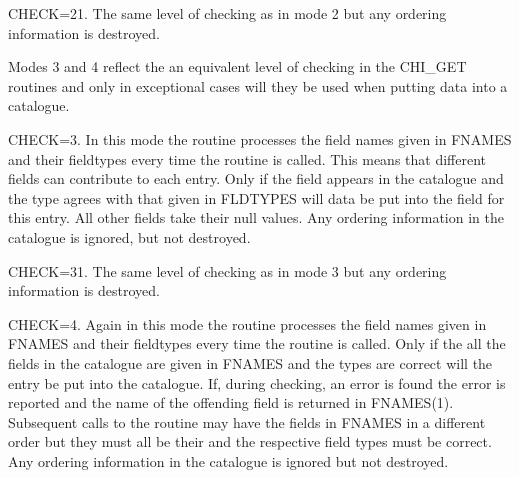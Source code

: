 \begin{small}
{{      CHECK=21. The same level of checking as in mode 2 but any ordering
      information is destroyed.

      Modes 3 and 4 reflect the an equivalent level of checking in the
      CHI\_GET routines and only in exceptional cases will they be used
      when putting data into a catalogue.

      CHECK=3. In this mode the routine processes the field names given in
      FNAMES and their fieldtypes every time the routine is called. This means
      that different fields can contribute to each entry. Only if the field
      appears in the catalogue and
      the type agrees with that given in FLDTYPES will data be put into
      the field for this entry. All other fields take their null values.
      Any ordering information in the catalogue
      is ignored, but not destroyed.

      CHECK=31. The same level of checking as in mode 3 but any ordering
      information is destroyed.

      CHECK=4. Again in this mode the routine processes the field names given
      in FNAMES and their fieldtypes every time the routine is called.  Only
      if the all the fields in the catalogue are given in FNAMES and the
      types are correct will the entry be put into the catalogue.  If, during
      checking, an error is found the error is reported and the name of the
      offending field is returned in FNAMES(1). Subsequent
      calls to the routine may have the fields in FNAMES in a different order
      but they must all be their and the respective field types must be correct.
      Any ordering information in the catalogue is ignored but not destroyed.

}}
\end{small}
